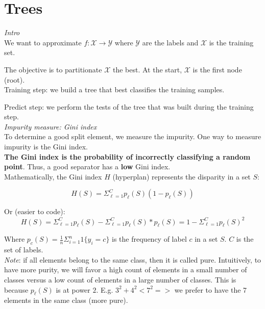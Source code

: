 \section*{Trees}

\label{sec:trees}

\vspace{5mm}

\textit{Intro} \\

We want to approximate $f: \mathcal{X} \to \mathcal{Y}$ where $\mathcal{Y}$ are the labels and $\mathcal{X}$ is the training set.

The objective is to partitionate $\mathcal{X}$ the best. At the start, $\mathcal{X}$ is the first node (root). \\

Training step: we build a tree that best classifies the training samples.

Predict step: we perform the tests of the tree that was built during the training step. \\

\textit{Impurity measure: Gini index} \\

To determine a good split element, we measure the impurity. One way to measure impurity is the Gini index. \\

\textbf{The Gini index is the probability of incorrectly classifying a random point}. Thus, a good separator has a \textbf{low} Gini index. \\

Mathematically, the Gini index $H$ (hyperplan) represents the disparity in a set $S$:

$$H(S)=\Sigma_{\ell=1}^C p_{\ell}(S)(1-p_{\ell}(S))$$

Or (easier to code): 
$$H(S)=\Sigma_{\ell=1}^C p_{\ell}(S)-\Sigma_{\ell=1}^C p_{\ell}(S)*p_{\ell}(S)=1-\Sigma_{\ell=1}^C p_{\ell}(S)^2$$

Where $p_{c}(S)=\frac{1}{n}\Sigma_{i=1}^n 1\{y_i=c\}$ is the frequency of label $c$ in a set $S$. $C$ is the set of labels. \\

\textit{Note}: if all elements belong to the same class, then it is called pure. Intuitively, to have more purity, we will favor a high count of elements in a small number of classes versus a low count of elements in a large number of classes. This is because $p_{\ell}(S)$ is at power $2$. E.g. $3^2 + 4^2 < 7^2 =>$ we prefer to have the 7 elements in the same class (more pure).\\


